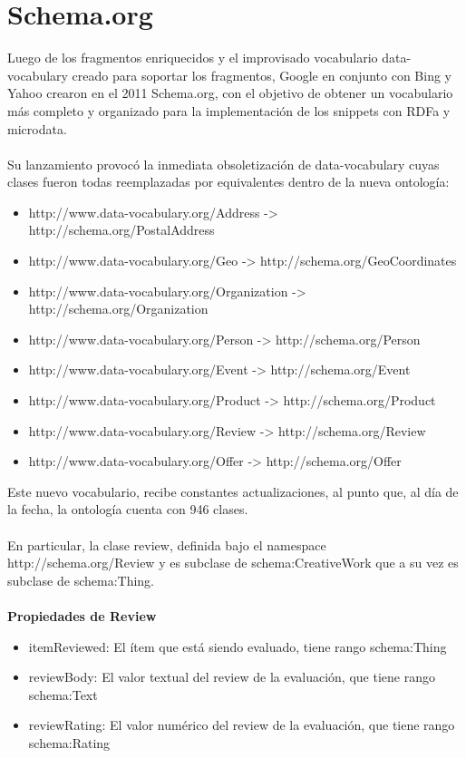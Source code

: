 \section{Schema.org}
\label{section:schema}

Luego de los fragmentos enriquecidos y el improvisado vocabulario data-vocabulary creado para soportar los fragmentos, Google 
en conjunto con Bing y Yahoo crearon en el 2011 Schema.org, con el objetivo de obtener un vocabulario más completo y 
organizado para la implementación de los snippets con RDFa y microdata.
\\\\
Su lanzamiento provocó la inmediata obsoletización de data-vocabulary cuyas clases fueron todas reemplazadas por equivalentes 
dentro de la nueva ontología:
\begin{itemize}
 \item http://www.data-vocabulary.org/Address -> http://schema.org/PostalAddress
 \item http://www.data-vocabulary.org/Geo -> http://schema.org/GeoCoordinates
 \item http://www.data-vocabulary.org/Organization -> http://schema.org/Organization
 \item http://www.data-vocabulary.org/Person -> http://schema.org/Person
 \item http://www.data-vocabulary.org/Event -> http://schema.org/Event
 \item http://www.data-vocabulary.org/Product -> http://schema.org/Product
 \item http://www.data-vocabulary.org/Review -> http://schema.org/Review
 \item http://www.data-vocabulary.org/Offer -> http://schema.org/Offer
\end{itemize}

\noindent Este nuevo vocabulario, recibe constantes actualizaciones, al punto que, al día de la fecha, la ontología cuenta con 946 clases. 
\\\\
En particular, la clase review, definida bajo el namespace http://schema.org/Review y es subclase de schema:CreativeWork 
que a su vez es subclase de schema:Thing.\\\\
\textbf{Propiedades de Review}
 \begin{itemize}
  \item itemReviewed: El ítem que está siendo evaluado, tiene rango schema:Thing 
  \item reviewBody: El valor textual del review de la evaluación, que tiene rango schema:Text 
  \item reviewRating: El valor numérico del review de la evaluación, que tiene rango schema:Rating 
 \end{itemize}

